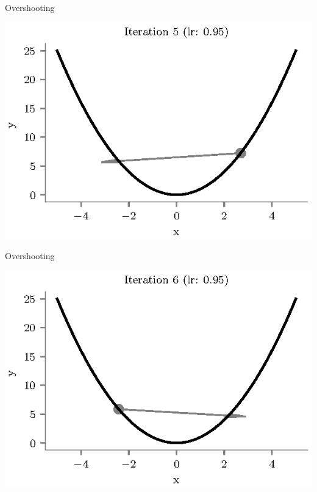 \documentclass{beamer}
\begin{document}
\begin{frame}{Overshooting}
\begin{center}
\includegraphics[totalheight=6cm]{overshooting-5.eps}
\end{center}
\end{frame}

\begin{frame}{Overshooting}
\begin{center}
\includegraphics[totalheight=6cm]{overshooting-6.eps}
\end{center}
\end{frame}
\end{document}
